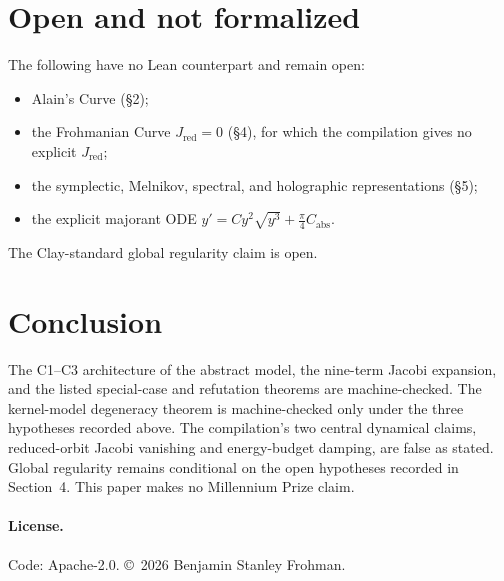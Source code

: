 \documentclass[11pt]{article}
\begin{document}
\section{Open and not formalized}
The following have no Lean counterpart and remain open:
\begin{itemize}
\item Alain's Curve (\S2);
\item the Frohmanian Curve $J_{\mathrm{red}}=0$ (\S4), for which the compilation gives no explicit $J_{\mathrm{red}}$;
\item the symplectic, Melnikov, spectral, and holographic representations (\S5);
\item the explicit majorant ODE $y'=Cy^2\sqrt{y^3}+\tfrac{\pi}{4}C_{\mathrm{abs}}$.
\end{itemize}
The Clay-standard global regularity claim is open.

\section{Conclusion}
The C1--C3 architecture of the abstract model, the nine-term Jacobi expansion, and the listed special-case and refutation theorems are machine-checked. The kernel-model degeneracy theorem is machine-checked only under the three hypotheses recorded above. The compilation's two central dynamical claims, reduced-orbit Jacobi vanishing and energy-budget damping, are false as stated. Global regularity remains conditional on the open hypotheses recorded in Section~4. This paper makes no Millennium Prize claim.

\paragraph{License.} Code: Apache-2.0. \copyright~2026 Benjamin Stanley Frohman.
\end{document}
